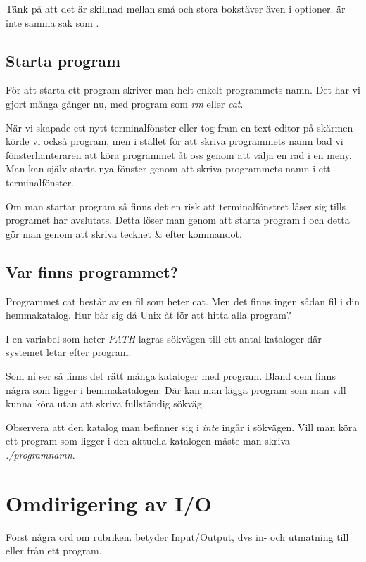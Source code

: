 \documentclass[a4paper,twocolumn]{book}
\begin{document}
Tänk på att det är skillnad mellan små och stora bokstäver även i
optioner.  är inte samma sak som .

\subsection{Starta program}

För att starta ett program skriver man helt enkelt programmets
namn. Det har vi gjort många gånger nu, med program som \emph{rm}
eller \emph{cat}.

När vi skapade ett nytt terminalfönster eller tog fram en text editor på
skärmen körde vi också program, men i stället för att skriva
programmets namn bad vi fönsterhanteraren att köra programmet åt oss
genom att välja en rad i en meny. Man kan själv starta nya fönster
genom att skriva programmets namn i ett terminalfönster.

Om man startar program så finns det en risk att terminalfönstret låser sig
tills programet har avslutats. Detta löser man genom att starta program i 
 och detta gör man genom att skriva tecknet \& efter 
kommandot.
\subsection{Var finns programmet?}

Programmet cat består av en fil som heter cat. Men det finns ingen
sådan fil i din hemmakatalog. Hur bär sig då Unix åt för att hitta
alla program?

I en variabel som heter \emph{PATH} lagras sökvägen till
ett antal kataloger där systemet letar efter program.


Som ni ser så finns det rätt många kataloger med program. Bland dem
finns några som ligger i hemmakatalogen. Där kan man lägga program som
man vill kunna köra utan att skriva fullständig sökväg.

Observera att den katalog man befinner sig i \emph{inte} ingår i
sökvägen. Vill man köra ett program  som ligger i den
aktuella katalogen måste man skriva \emph{./programnamn}.

\section{Omdirigering av I/O}

Först några ord om rubriken.  betyder Input/Output, dvs in-
och utmatning till eller från ett program.
\end{document}
